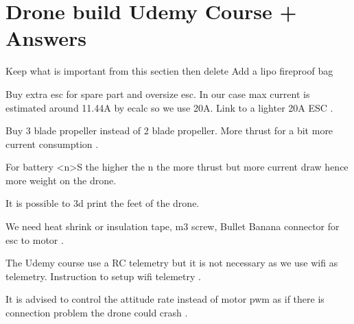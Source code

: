 \section{Drone build Udemy Course + Answers}
    {\color{red} Keep what is important from this sectien then delete}
    Add a lipo fireproof bag
    
    Buy extra esc for spare part and oversize esc. In our case max current is estimated around 11.44A by ecalc so we use 20A. Link to a lighter 20A ESC \cite{bangood_racerstar}.
    
    Buy 3 blade propeller instead of 2 blade propeller. More thrust for a bit more current consumption \cite{bangood_propeller_3_blade}.
    
    For battery <n>S the higher the n the more thrust but more current draw hence more weight on the drone.
    
    It is possible to 3d print the feet of the drone.
    
    We need heat shrink or insulation tape, m3 screw, Bullet Banana connector for esc to motor \cite{bangood_bullet_banana_connector}.
    
    The Udemy course use a RC telemetry but it is not necessary as we use wifi as telemetry. Instruction to setup wifi telemetry \cite{emlid_ardupilot_installation}.
    
    
    It is advised to control the attitude rate instead of motor pwm as if there is connection problem the drone could crash \cite{px4_low_level_control}.